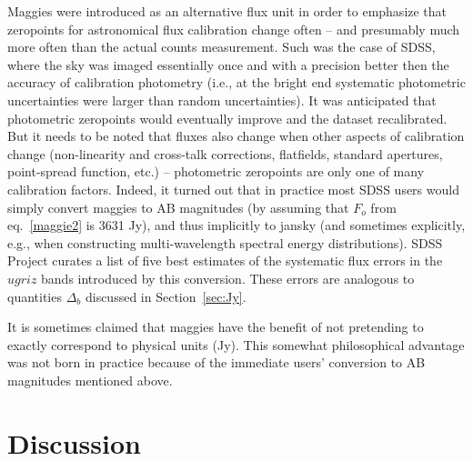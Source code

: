 \documentclass[DM,toc]{lsstdoc}
\begin{document}
Maggies were introduced as an alternative flux unit in order to emphasize
that zeropoints for astronomical flux calibration change often -- and
presumably much more often than the actual counts measurement. Such
was the case of SDSS, where the sky was imaged essentially once and with
a precision better then the accuracy of calibration photometry (i.e., at
the bright end systematic photometric uncertainties were larger than
random uncertainties). It was anticipated that photometric zeropoints
would eventually improve and the dataset recalibrated.  But it needs to
be noted that fluxes also change when other aspects of calibration change
(non-linearity and cross-talk corrections, flatfields, standard apertures,
point-spread function, etc.) -- photometric zeropoints are only one of
many calibration factors. Indeed, it turned out that in practice most
SDSS users would simply convert maggies to AB magnitudes (by assuming
that $F_o$ from eq.~\ref{maggie2} is 3631 Jy), and thus
implicitly to jansky (and sometimes explicitly, e.g., when constructing
multi-wavelength spectral energy distributions). SDSS Project curates a
list of five best estimates of the systematic flux errors in the $ugriz$
bands introduced by this conversion. These errors are analogous to
quantities $\Delta_b$ discussed in Section~\ref{sec:Jy}.

It is sometimes claimed that maggies have the benefit of not pretending
to exactly correspond to physical units (Jy). This somewhat philosophical
advantage was not born in practice because of the immediate users'
conversion to AB magnitudes mentioned above.


\section{Discussion}
\end{document}
